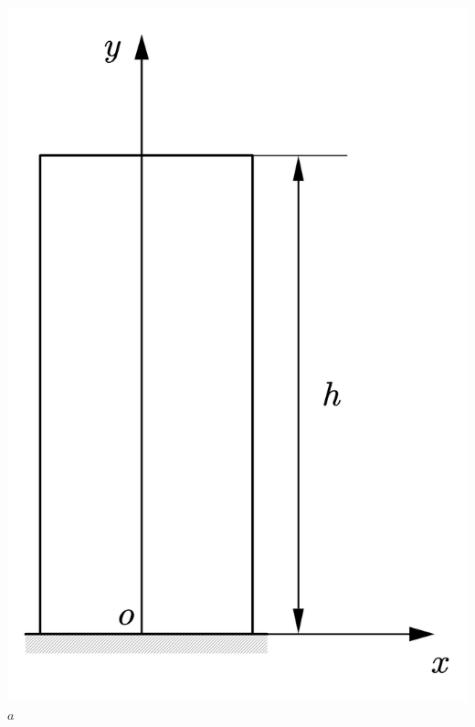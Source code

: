 \begin{center}
	\begin{minipage}[c]{0.3\textwidth}
		\centering
		\includegraphics[scale=0.3]{figure/2-5.png}\\
		$a$
	\end{minipage}
\begin{minipage}[c]{0.3\textwidth}
	\centering

\end{minipage}
\end{center}
